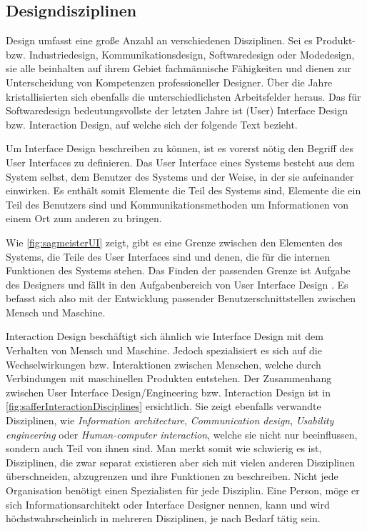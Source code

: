 \subsection{Designdisziplinen} 
Design umfasst eine große Anzahl an verschiedenen Disziplinen. Sei es Produkt- bzw. Industriedesign, Kommunikationsdesign, Softwaredesign oder Modedesign, sie alle beinhalten auf ihrem Gebiet fachmännische Fähigkeiten und dienen zur Unterscheidung von Kompetenzen professioneller Designer. Über die Jahre kristallisierten sich ebenfalls die unterschiedlichsten Arbeitsfelder heraus. Das für Softwaredesign bedeutungsvollste der letzten Jahre ist (User) Interface Design bzw. Interaction Design, auf welche sich der folgende Text bezieht.

Um Interface Design beschreiben zu können, ist es vorerst nötig den Begriff des User Interfaces zu definieren. Das User Interface eines Systems besteht aus dem System selbst, dem Benutzer des Systems und der Weise, in der sie aufeinander einwirken. Es enthält somit Elemente die Teil des Systems sind, Elemente die ein Teil des Benutzers sind und Kommunikationsmethoden um Informationen von einem Ort zum anderen zu bringen.

\medskip Wie \autoref{fig:sagmeisterUI} zeigt, gibt es eine Grenze zwischen den Elementen des Systems, die Teile des User Interfaces sind und	denen, die für	die	internen Funktionen des Systems stehen. Das Finden der passenden Grenze ist Aufgabe des	Designers und fällt	in den Aufgabenbereich	von	User Interface Design \citep{Barfield:1993}. Es befasst sich also mit der Entwicklung passender Benutzerschnittstellen zwischen Mensch und Maschine.

\medskip Interaction Design beschäftigt sich ähnlich wie Interface Design mit dem Verhalten von Mensch und Maschine. Jedoch spezialisiert es sich auf die Wechselwirkungen bzw. Interaktionen zwischen Menschen, welche durch Verbindungen mit maschinellen Produkten entstehen. Der Zusammenhang zwischen User Interface Design/Engineering bzw. Interaction Design ist in \autoref{fig:safferInteractionDisciplines} ersichtlich. Sie zeigt ebenfalls verwandte Disziplinen, wie \emph{Information architecture}, \emph{Communication design}, \emph{Usability engineering} oder \emph{Human-computer interaction}, welche sie nicht nur beeinflussen, sondern auch Teil von ihnen sind. Man merkt somit wie schwierig es ist, Disziplinen, die zwar separat existieren aber sich mit vielen anderen Disziplinen überschneiden, abzugrenzen und ihre Funktionen zu beschreiben. Nicht jede Organisation benötigt einen Spezialisten für jede Disziplin. Eine Person, möge er sich Informationsarchitekt oder Interface Designer nennen, kann und wird höchstwahrscheinlich in mehreren Disziplinen, je nach Bedarf tätig sein. \citep{Saffer:2007}

